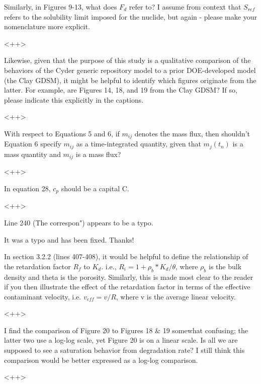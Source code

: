 \documentclass[answers,12pt]{exam}
\begin{document}
\begin{questions}
\question Similarly, in Figures 9-13, what does $F_d$ refer to? I assume from 
context that $S_{ref}$ refers to the solubility limit imposed for the nuclide, but again - please make your nomenclature more explicit. 
\begin{solution}
<++>
\end{solution}

\question Likewise, given that the purpose of this study is a qualitative comparison of the behaviors of the Cyder generic repository model to a prior DOE-developed model (the Clay GDSM), it might be helpful to identify which figures originate from the latter. For example, are Figures 14, 18, and 19 from the Clay GDSM? If so, please indicate this explicitly in the captions. 
\begin{solution}
<++>
\end{solution}

\question With respect to Equations 5 and 6, if $m_{ij}$ denotes the mass flux, 
then shouldn't Equation 6 specify $m_{ij}$ as a time-integrated quantity, given 
that $m_j(t_n)$ is a mass quantity and $m_{ij}$ is a mass flux?
\begin{solution}
<++>
\end{solution}

\question In equation 28, $c_p$ should be a capital C.
\begin{solution}
<++>
\end{solution}

\question Line 240 (The correspon") appears to be a typo.
\begin{solution}
It was a typo and has been fixed. Thanks!
\end{solution}

\question In section 3.2.2 (lines 407-408), it would be helpful to define the relationship of the retardation factor $R_f$ to $K_d$. i.e., $R_i = 1 + \rho_b 
* K_d / \theta$, where $\rho_b$ is the bulk density and theta is the porosity.  Similarly, this is made most clear to the reader if you then illustrate the effect of the retardation factor in terms of the effective contaminant velocity, i.e. $v_{eff} = v/R$, where v is the average linear velocity.
\begin{solution}
<++>
\end{solution}

\question I find the comparison of Figure 20 to Figures 18 \& 19 somewhat confusing; the latter two use a log-log scale, yet Figure 20 is on a linear scale. Is all we are supposed to see a saturation behavior from degradation rate? I still think this comparison would be better expressed as a log-log comparison.
\begin{solution}
<++>
\end{solution}


\end{questions}
\end{document}
